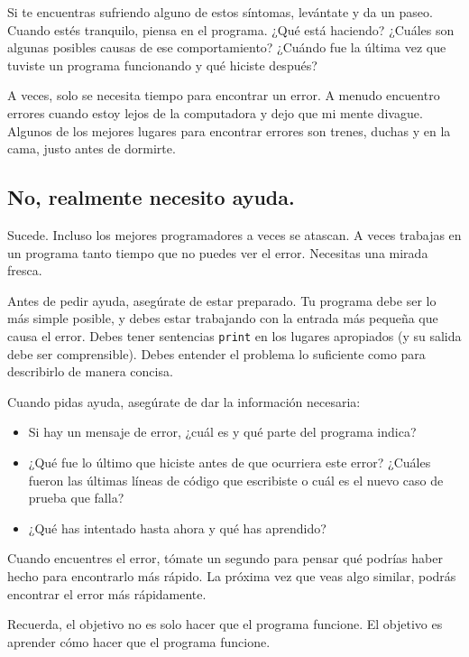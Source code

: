 Si te encuentras sufriendo alguno de estos síntomas, levántate y da un paseo. Cuando estés tranquilo, piensa en el programa. ¿Qué está haciendo? ¿Cuáles son algunas posibles causas de ese comportamiento? ¿Cuándo fue la última vez que tuviste un programa funcionando y qué hiciste después?

A veces, solo se necesita tiempo para encontrar un error. A menudo encuentro errores cuando estoy lejos de la computadora y dejo que mi mente divague. Algunos de los mejores lugares para encontrar errores son trenes, duchas y en la cama, justo antes de dormirte.

\subsection{No, realmente necesito ayuda.}

Sucede. Incluso los mejores programadores a veces se atascan. A veces trabajas en un programa tanto tiempo que no puedes ver el error. Necesitas una mirada fresca.

Antes de pedir ayuda, asegúrate de estar preparado. Tu programa debe ser lo más simple posible, y debes estar trabajando con la entrada más pequeña que causa el error. Debes tener sentencias \texttt{print} en los lugares apropiados (y su salida debe ser comprensible). Debes entender el problema lo suficiente como para describirlo de manera concisa.

Cuando pidas ayuda, asegúrate de dar la información necesaria:

\begin{itemize}
    \item Si hay un mensaje de error, ¿cuál es y qué parte del programa indica?
    \item ¿Qué fue lo último que hiciste antes de que ocurriera este error? ¿Cuáles fueron las últimas líneas de código que escribiste o cuál es el nuevo caso de prueba que falla?
    \item ¿Qué has intentado hasta ahora y qué has aprendido?
\end{itemize}

Cuando encuentres el error, tómate un segundo para pensar qué podrías haber hecho para encontrarlo más rápido. La próxima vez que veas algo similar, podrás encontrar el error más rápidamente.

Recuerda, el objetivo no es solo hacer que el programa funcione. El objetivo es aprender cómo hacer que el programa funcione.